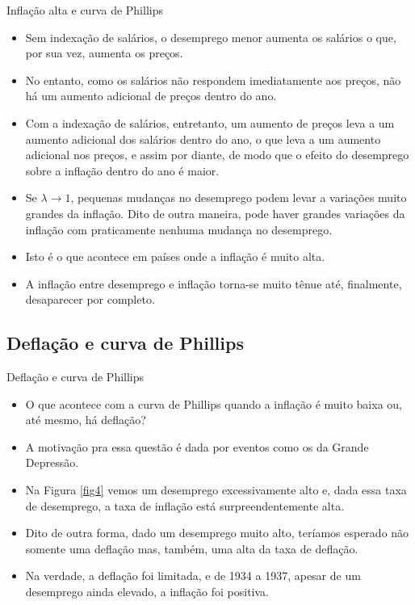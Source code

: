 \documentclass[10pt]{beamer}
\begin{document}
\begin{frame}{Inflação alta e curva de Phillips}
    \begin{itemize}
        \item Sem indexação de salários, o desemprego menor aumenta os salários o que, por sua vez, aumenta os preços.
        \bigskip
        \item No entanto, como os salários não respondem imediatamente aos preços, não há um aumento adicional de preços dentro do ano.
        \bigskip
        \item Com a indexação de salários, entretanto, um aumento de preços leva a um aumento adicional dos salários dentro do ano, o que leva a um aumento adicional nos preços, e assim por diante, de modo que o efeito do desemprego sobre a inflação dentro do ano é maior.
        \bigskip
        \item Se $\lambda \to 1$, pequenas mudanças no desemprego podem levar a variações muito grandes da inflação. Dito de outra maneira, pode haver grandes variações da inflação com praticamente nenhuma mudança no desemprego.
        \bigskip
        \item Isto é o que acontece em países onde a inflação é muito alta.
        \bigskip
        \item A inflação entre desemprego e inflação torna-se muito tênue até, finalmente, desaparecer por completo.
    \end{itemize}
\end{frame}

\subsection{Deflação e curva de Phillips}
\begin{frame}{Deflação e curva de Phillips}
    \begin{itemize}
        \item O que acontece com a curva de Phillips quando a inflação é muito baixa ou, até mesmo, há deflação?
        \bigskip
        \item A motivação pra essa questão é dada por eventos como os da Grande Depressão.
        \bigskip
        \item Na Figura \ref{fig4} vemos um desemprego excessivamente alto e, dada essa taxa de desemprego, a taxa de inflação está surpreendentemente alta.
        \bigskip
        \item Dito de outra forma, dado um desemprego muito alto, teríamos esperado não somente uma deflação mas, também, uma alta da taxa de deflação.
        \bigskip
        \item Na verdade, a deflação foi limitada, e de 1934 a 1937, apesar de um desemprego ainda elevado, a inflação foi positiva.
    \end{itemize}
\end{frame}
\end{document}
